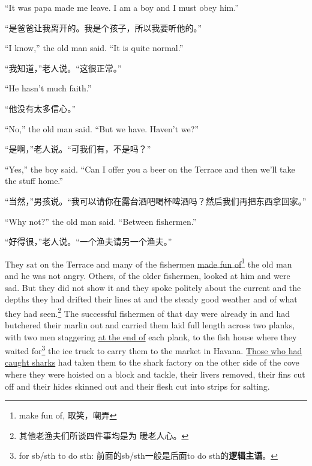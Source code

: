 \begin{paracol}{2}
``It was papa made me leave. I am a boy and I must \gls{obey} him.''

\switchcolumn

“是爸爸让我离开的。我是个孩子，所以我要听他的。”

\switchcolumn*

``I know,'' the old man said. ``It is quite normal.''

\switchcolumn

“我知道，”老人说。“这很正常。”

\switchcolumn*

``He hasn't much \gls{faith}.''

\switchcolumn

“他没有太多信心。”

\switchcolumn*

``No,'' the old man said. ``But we have. Haven't we?''

\switchcolumn

“是啊，”老人说。“可我们有，不是吗？”

\switchcolumn*

``Yes,'' the boy said. ``Can I offer you a beer on the \gls{Terrace} and then we'll take the \gls{stuff} home.''

\switchcolumn

“当然，”男孩说。“我可以请你在露台酒吧喝杯啤酒吗？然后我们再把东西拿回家。”

\switchcolumn*

``Why not?'' the old man said. ``Between fishermen.''

\switchcolumn

“好得很，”老人说。“一个渔夫请另一个渔夫。”

\switchcolumn*

They sat on the Terrace and many of the fishermen \uline{made fun
  of}\footnote{make fun of, 取笑，嘲弄} the old man and he was not angry.
Others, of the older fishermen, looked at him and were sad. But they did not
show it and they spoke \gls{politely} about the \gls{current} and the
\glspl{depth} they had \gls{drifted} their lines at and the \gls{steady}
good weather and of what they had seen.\footnote{其他老渔夫们所谈四件事均是为
  暖老人心。} The successful fishermen of that day were already in and had
\gls{butchered} their \gls{marlin} out and carried them \gls{laid} full
length across two \glspl{plank}, with two men \gls{staggering} \uline{at the
  end of} each plank, to the fish house where they waited for\footnote{for
  sb/sth to do sth: 前面的sb/sth一般是后面to do sth的\textbf{逻辑主语}。} the
ice truck to carry them to the market in Havana. \uline{Those who had caught
  \glspl{shark}} had taken them to the shark factory on the other side of
the \gls{cove} where they were \gls{hoisted} on a \gls{block} and
\gls{tackle}, their \glspl{liver} removed, their \glspl{fin} cut off and
their \glspl{hide} \gls{skinned} out and their \gls{flesh} cut into
\glspl{strip} for salting.


\end{paracol}

